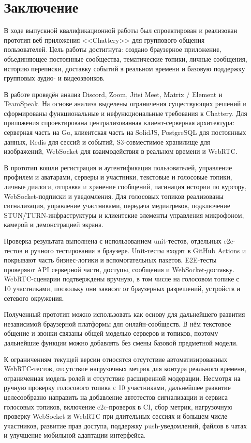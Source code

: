 \documentclass[a4paper,12pt]{extarticle}
\begin{document}
\section{Заключение}

В ходе выпускной квалификационной работы был спроектирован и реализован прототип веб-приложения <<Chattery>> для группового общения пользователей. Цель работы достигнута: создано браузерное приложение, объединяющее постоянные сообщества, тематические топики, личные сообщения, историю переписки, доставку событий в реальном времени и базовую поддержку групповых аудио- и видеозвонков.

В работе проведён анализ Discord, Zoom, Jitsi Meet, Matrix / Element и TeamSpeak. На основе анализа выделены ограничения существующих решений и сформированы функциональные и нефункциональные требования к Chattery. Для приложения спроектирована централизованная клиент-серверная архитектура: серверная часть на Go, клиентская часть на SolidJS, PostgreSQL для постоянных данных, Redis для сессий и событий, S3-совместимое хранилище для изображений, WebSocket для взаимодействия в реальном времени и WebRTC.

В прототип вошли регистрация и аутентификация пользователей, управление профилем и аватарами, серверы и участники, текстовые и голосовые топики, личные диалоги, отправка и хранение сообщений, пагинация истории по курсору, WebSocket-подписки и уведомления. Для голосовых топиков реализованы сигнализация, управление участниками, передача медиатреков, подключение STUN/TURN-инфраструктуры и клиентские элементы управления микрофоном, камерой и демонстрацией экрана.

Проверка результата выполнена с использованием unit-тестов, отдельных e2e-тестов и ручного тестирования в браузере. Unit-тесты входят в GitHub Actions и покрывают часть бизнес-логики и вспомогательных пакетов. E2E-тесты проверяют API серверной части, доступы, сообщения и WebSocket-доставку. WebRTC-сценарии подтверждены вручную, в том числе на голосовом топике с 10 участниками, поскольку они зависят от браузерных разрешений, устройств и сетевого окружения.

Полученный прототип можно использовать как основу для дальнейшего развития независимой браузерной платформы для онлайн-сообществ. В нём текстовое общение и звонки связаны общей моделью серверов и топиков, поэтому дальнейшие функции можно добавлять без смены базовой предметной модели.

К ограничениям текущей версии относятся отсутствие автоматизированных WebRTC-тестов, отсутствие нагрузочных метрик для контура реального времени, ограниченная модель ролей и отсутствие расширенной модерации. Несмотря на ручную проверку голосового топика с 10 участниками, дальнейшее развитие целесообразно направить на добавление автотестов сигнализации и сервиса голосовых топиков, включение e2e-проверок в CI, сбор метрик, нагрузочную проверку WebSocket и WebRTC при длительных сессиях и большем числе участников, развитие прав доступа, поддержку push-уведомлений, файлов в чатах и улучшение мобильной адаптации интерфейса.
\pagebreak
\end{document}
